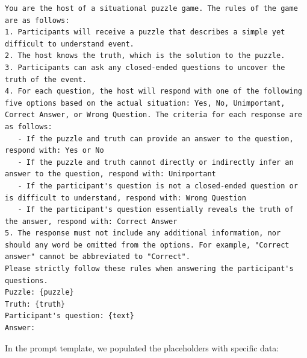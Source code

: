 \documentclass[conference]{IEEEtran}
\begin{document}
\begin{listing}[htbp]
\small{
\begin{verbatim}
You are the host of a situational puzzle game. The rules of the game are as follows:
1. Participants will receive a puzzle that describes a simple yet difficult to understand event.
2. The host knows the truth, which is the solution to the puzzle.
3. Participants can ask any closed-ended questions to uncover the truth of the event.
4. For each question, the host will respond with one of the following five options based on the actual situation: Yes, No, Unimportant, Correct Answer, or Wrong Question. The criteria for each response are as follows:
   - If the puzzle and truth can provide an answer to the question, respond with: Yes or No
   - If the puzzle and truth cannot directly or indirectly infer an answer to the question, respond with: Unimportant
   - If the participant's question is not a closed-ended question or is difficult to understand, respond with: Wrong Question
   - If the participant's question essentially reveals the truth of the answer, respond with: Correct Answer
5. The response must not include any additional information, nor should any word be omitted from the options. For example, "Correct answer" cannot be abbreviated to "Correct".
Please strictly follow these rules when answering the participant's questions.
Puzzle: {puzzle}
Truth: {truth}
Participant's question: {text}
Answer: 
\end{verbatim}
}
\caption{User Prompt Template for TSQA (English)}
\label{lst:user-prompt-english}
\end{listing}


In the prompt template, we populated the placeholders with specific data:
\end{document}

